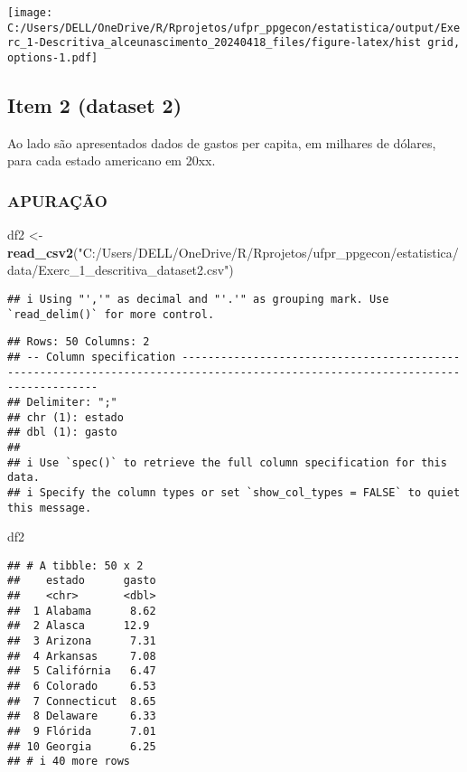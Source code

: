 \documentclass[
]{article}
\newenvironment{Shaded}{\begin{snugshade}}{\end{snugshade}}
\newcommand{\FunctionTok}[1]{\textcolor[rgb]{0.13,0.29,0.53}{\textbf{#1}}}
\newcommand{\NormalTok}[1]{#1}
\newcommand{\OtherTok}[1]{\textcolor[rgb]{0.56,0.35,0.01}{#1}}
\newcommand{\StringTok}[1]{\textcolor[rgb]{0.31,0.60,0.02}{#1}}
\begin{document}
\texttt{[image: C:/Users/DELL/OneDrive/R/Rprojetos/ufpr\_ppgecon/estatistica/output/Exerc\_1-Descritiva\_alceunascimento\_20240418\_files/figure-latex/hist grid, options-1.pdf]}

\hypertarget{item-2-dataset-2}{%
\subsection{Item 2 (dataset 2)}\label{item-2-dataset-2}}

Ao lado são apresentados dados de gastos per capita, em milhares de
dólares, para cada estado americano em 20xx.

\hypertarget{apurauxe7uxe3o-1}{%
\subsubsection{APURAÇÃO}\label{apurauxe7uxe3o-1}}

\begin{Shaded}
\begin{Highlighting}[]
\NormalTok{df2 }\OtherTok{\textless{}{-}} \FunctionTok{read\_csv2}\NormalTok{(}\StringTok{"C:/Users/DELL/OneDrive/R/Rprojetos/ufpr\_ppgecon/estatistica/data/Exerc\_1\_descritiva\_dataset2.csv"}\NormalTok{)}
\end{Highlighting}
\end{Shaded}

\begin{verbatim}
## i Using "','" as decimal and "'.'" as grouping mark. Use `read_delim()` for more control.
\end{verbatim}

\begin{verbatim}
## Rows: 50 Columns: 2
## -- Column specification -------------------------------------------------------------------------------------------------------------------------------
## Delimiter: ";"
## chr (1): estado
## dbl (1): gasto
## 
## i Use `spec()` to retrieve the full column specification for this data.
## i Specify the column types or set `show_col_types = FALSE` to quiet this message.
\end{verbatim}

\begin{Shaded}
\begin{Highlighting}[]
\NormalTok{df2}
\end{Highlighting}
\end{Shaded}

\begin{verbatim}
## # A tibble: 50 x 2
##    estado      gasto
##    <chr>       <dbl>
##  1 Alabama      8.62
##  2 Alasca      12.9 
##  3 Arizona      7.31
##  4 Arkansas     7.08
##  5 Califórnia   6.47
##  6 Colorado     6.53
##  7 Connecticut  8.65
##  8 Delaware     6.33
##  9 Flórida      7.01
## 10 Georgia      6.25
## # i 40 more rows
\end{verbatim}
\end{document}
